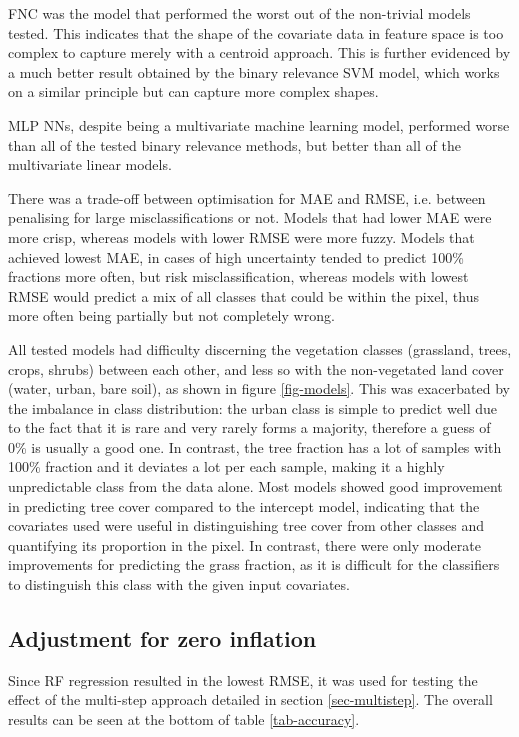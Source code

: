 \documentclass[review,authoryear,3p]{elsarticle}
\begin{document}
\Gls{FNC} was the model that performed the worst out of the non-trivial models tested.
This indicates that the shape of the covariate data in feature space is too complex to capture merely with a centroid approach.
This is further evidenced by a much better result obtained by the binary relevance \gls{SVM} model, which works on a similar principle but can capture more complex shapes.

\Gls{MLP} \glspl{NN}, despite being a multivariate machine learning model, performed worse than all of the tested binary relevance methods, but better than all of the multivariate linear models.

There was a trade-off between optimisation for \gls{MAE} and \gls{RMSE}, i.e. between penalising for large misclassifications or not.
Models that had lower \gls{MAE} were more crisp, whereas models with lower \gls{RMSE} were more fuzzy.
Models that achieved lowest \gls{MAE}, in cases of high uncertainty tended to predict 100\% fractions more often, but risk misclassification, whereas models with lowest \gls{RMSE} would predict a mix of all classes that could be within the pixel, thus more often being partially but not completely wrong.

All tested models had difficulty discerning the vegetation classes (grassland, trees, crops, shrubs) between each other, and less so with the non-vegetated land cover (water, urban, bare soil), as shown in figure \ref{fig-models}.
This was exacerbated by the imbalance in class distribution: the urban class is simple to predict well due to the fact that it is rare and very rarely forms a majority, therefore a guess of 0\% is usually a good one.
In contrast, the tree fraction has a lot of samples with 100\% fraction and it deviates a lot per each sample, making it a highly unpredictable class from the data alone.
Most models showed good improvement in predicting tree cover compared to the intercept model, indicating that the covariates used were useful in distinguishing tree cover from other classes and quantifying its proportion in the pixel.
In contrast, there were only moderate improvements for predicting the grass fraction, as it is difficult for the classifiers to distinguish this class with the given input covariates.

\subsection{Adjustment for zero inflation}

Since \gls{RF} regression resulted in the lowest RMSE, it was used for testing the effect of the multi-step approach detailed in section \ref{sec-multistep}.
The overall results can be seen at the bottom of table \ref{tab-accuracy}.
\end{document}
